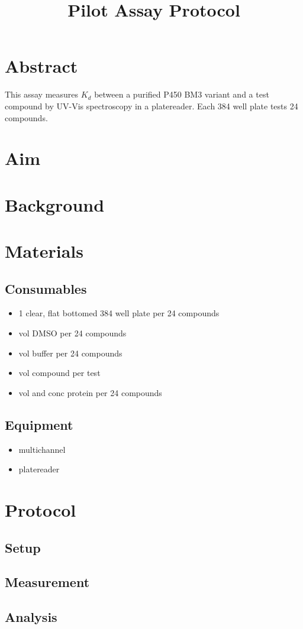 \documentclass{article}
\begin{document}
\title{\textbf{Pilot Assay Protocol}}
\maketitle

\section{Abstract}
This assay measures $K_d$ between a purified P450 BM3 variant and a test compound by UV-Vis spectroscopy in a platereader. Each 384 well plate tests 24 compounds. 

\section{Aim}

\section{Background}

\section{Materials}

\subsection{Consumables}
\begin{itemize}
	\item 1 clear, flat bottomed 384 well plate per 24 compounds
	\item vol DMSO per 24 compounds
	\item vol buffer per 24 compounds
	\item vol compound per test
	\item vol and conc protein per 24 compounds
\end{itemize}

\subsection{Equipment}
\begin{itemize}
	\item multichannel
	\item platereader
\end{itemize}

\section{Protocol}
\subsection{Setup}
\subsection{Measurement}
\subsection{Analysis}
\end{document}
